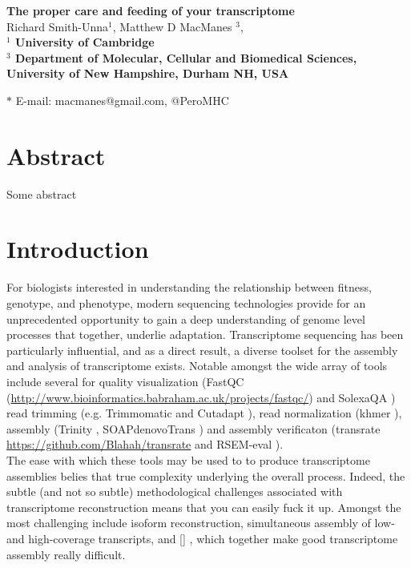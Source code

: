 \documentclass[11pt]{article}
\date{}
\begin{document}
\begin{flushleft}
{\Large
\textbf{The proper care and feeding of your transcriptome}
} \\

Richard Smith-Unna$^{1}$, 
Matthew D MacManes $^{3}$, 
\\


\bf{$^{1}$} University of Cambridge \\
\bf{$^{3}$} Department of Molecular, Cellular and Biomedical Sciences, University of New Hampshire, Durham NH, USA


$\ast$ E-mail: macmanes@gmail.com, @PeroMHC
\end{flushleft}

\linenumbers

\section*{Abstract}
Some abstract


\section*{Introduction}

For biologists interested in understanding the relationship between fitness, genotype, and phenotype, modern sequencing technologies provide for an unprecedented opportunity to gain a deep understanding of genome level processes that together, underlie adaptation. Transcriptome sequencing has been particularly influential, and as a direct result, a diverse toolset for the assembly and analysis of transcriptome exists. Notable amongst the wide array of tools include several for quality visualization (FastQC (\url{http://www.bioinformatics.babraham.ac.uk/projects/fastqc/}) and SolexaQA \citep{Cox:2010ch}) read trimming (e.g. Trimmomatic \citep{Bolger:2014ek} and Cutadapt \citep{Martin:2011va}), read normalization (khmer \citep{Pell:2012id}), assembly (Trinity \citep{Haas:2013jq}, SOAPdenovoTrans \citep{Xie:2013wu}) and assembly verificaton (transrate \url{https://github.com/Blahah/transrate} and RSEM-eval \citep{Li:2014er}).  \\

The ease with which these tools may be used to to produce transcriptome assemblies belies that true complexity underlying the overall process. Indeed, the subtle (and not so subtle) methodological challenges associated with transcriptome reconstruction means that you can easily fuck it up. Amongst the most challenging include isoform reconstruction, simultaneous assembly of low- and high-coverage transcripts, and [] \citep{Modrek:2001ud,Johnson:2003kh}, which together make good transcriptome assembly really difficult. \\
 
\end{document}
